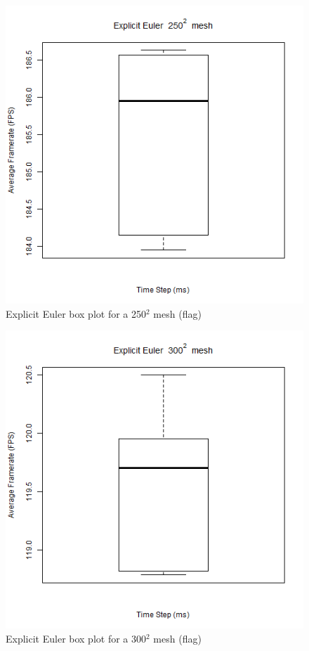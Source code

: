      \begin{figure}
    \begin{center}
      \includegraphics[scale=.9]{Figures/flag_ee_250_box}
    \end{center}
    \caption{Explicit Euler box plot for a 250$^{2}$ mesh (flag)}
    \label{fig:ee box 250 flag}
  \end{figure}
  
      \begin{figure}
    \begin{center}
      \includegraphics[scale=.9]{Figures/flag_ee_300_box}
    \end{center}
    \caption{Explicit Euler box plot for a 300$^{2}$ mesh (flag)}
    \label{fig:ee box 300 flag}
  \end{figure}

